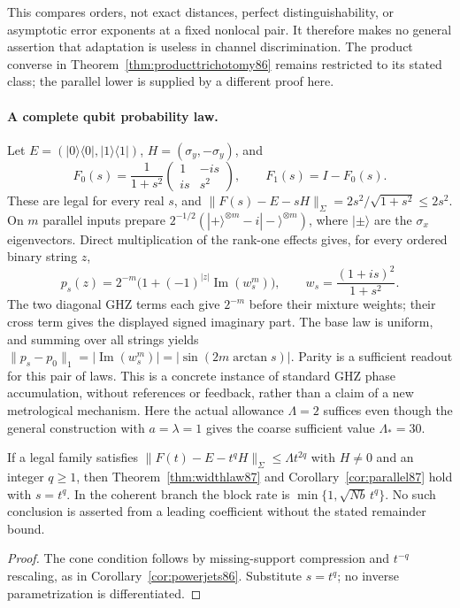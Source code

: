 This compares orders, not exact distances, perfect distinguishability,
or asymptotic error exponents at a fixed nonlocal pair.  It therefore
makes no general assertion that adaptation is useless in channel
discrimination.  The product converse in
Theorem~\ref{thm:producttrichotomy86} remains restricted to its stated
class; the parallel lower is supplied by a different proof here.

\paragraph{A complete qubit probability law.}
Let $E=(|0\rangle\langle0|,|1\rangle\langle1|)$,
$H=(\sigma_y,-\sigma_y)$, and
\[
 F_0(s)=\frac1{1+s^2}
       \begin{pmatrix}1&-is\\is&s^2\end{pmatrix},\qquad
 F_1(s)=I-F_0(s).
\]
These are legal for every real $s$, and
$\|F(s)-E-sH\|_\Sigma=2s^2/\sqrt{1+s^2}\le2s^2$.
On $m$ parallel inputs prepare
$2^{-1/2}(|+\rangle^{\otimes m}-i|-\rangle^{\otimes m})$,
where $|\pm\rangle$ are the $\sigma_x$ eigenvectors.
Direct multiplication of the rank-one effects gives, for every
ordered binary string $z$,
\begin{equation}\label{eq:parallelqubit87}
 p_s(z)=2^{-m}\bigl(1+(-1)^{|z|}\operatorname{Im}(w_s^m)\bigr),
 \qquad w_s=\frac{(1+is)^2}{1+s^2}.
\end{equation}
The two diagonal GHZ terms each give $2^{-m}$ before their
mixture weights; their cross term gives the displayed signed
imaginary part.  The base law is uniform, and summing over all
strings yields
$\|p_s-p_0\|_1=|\operatorname{Im}(w_s^m)|
=|\sin(2m\arctan s)|$.  Parity is a sufficient readout for this
pair of laws.  This is a concrete instance of standard GHZ phase
accumulation, without references or feedback, rather than a
claim of a new metrological mechanism.  Here the actual allowance
$\Lambda=2$ suffices even though the general construction with
$a=\lambda=1$ gives the coarse sufficient value $\Lambda_*=30$.

\begin{corollary}\label{cor:widthpower87}
If a legal family satisfies
$\|F(t)-E-t^qH\|_{\Sigma}\le\Lambda t^{2q}$ with $H\ne0$
and an integer $q\ge1$, then Theorem~\ref{thm:widthlaw87} and
Corollary~\ref{cor:parallel87} hold with $s=t^q$.
In the coherent branch the block rate is
$\min\{1,\sqrt{Nb}\,t^q\}$.  No such conclusion is asserted
from a leading coefficient without the stated remainder bound.
\end{corollary}
\begin{proof}
The cone condition follows by missing-support compression and
$t^{-q}$ rescaling, as in Corollary~\ref{cor:powerjets86}.
Substitute $s=t^q$; no inverse parametrization is differentiated.
\end{proof}
